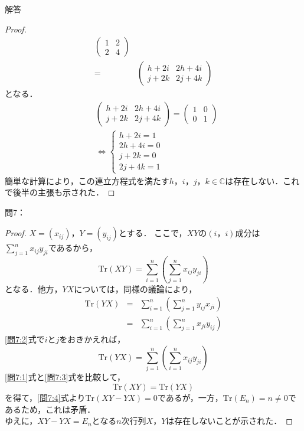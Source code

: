 \documentclass[dvipdfmx,uplatex,11pt]{jsarticle}
\begin{document}
\begin{leftbar}
\begin{itembox}[c]{解答}
\begin{proof}
\begin{align}
\begin{pmatrix}
1 & 2 \\
2 & 4
\end{pmatrix}
\\
 =&
\begin{pmatrix}
h+2 i & 2h + 4i \\
j + 2k & 2j +4k
\end{pmatrix}
\end{align}
となる．
\begin{align}
&
\begin{pmatrix}
h+2 i & 2h + 4i \\
j + 2k & 2j +4k
\end{pmatrix}
=
\begin{pmatrix}
1 & 0 \\
0 & 1 
\end{pmatrix}
\\
&\Leftrightarrow 
\begin{cases}
h+2 i =1 \\
2h + 4i =0 \\
j + 2k =0 \\
2j +4k =1
\end{cases}
\end{align}
簡単な計算により，この連立方程式を満たす$h，i，j，k \in \mathbb{C}$は存在しない．これで後半の主張も示された．
\end{proof}
\end{itembox}
\end{leftbar}
%
\newpage
\setcounter{equation}{0}
問7：
\begin{leftbar}
\begin{proof}
$X=(x_{ij})$，$Y=(y_{ij})$とする．
ここで，$XY$の$(i，i)$成分は$\sum_{j=1}^{n} x_{ij} y_{ji}$であるから，
\begin{equation}
\label{問7:1}
\mathrm{Tr}(XY)  =  \sum_{i=1}^{n} \left( \sum_{j=1}^{n} x_{ij} y_{ji} \right)
\end{equation}
となる．他方，$YX$については，同様の議論により，
\begin{eqnarray}
\mathrm{Tr} (YX) & = & \sum_{i=1}^{n} \left( \sum_{j=1}^{n}  y_{ij} x_{ji} \right) \nonumber \\
\label{問7:2}
 & = & \sum_{i=1}^{n} \left( \sum_{j=1}^{n}  x_{ji} y_{ij}  \right)
\end{eqnarray}
\eqref{問7:2}式で$i$と$j$をおきかえれば，
\begin{equation}
\label{問7:3}
\mathrm{Tr} (YX) = \sum_{j=1}^{n} \left( \sum_{i=1}^{n}  x_{ij} y_{ji}  \right)
\end{equation}
\eqref{問7:1}式と\eqref{問7:3}式を比較して，
\begin{equation}
\label{問7:4}
\mathrm{Tr} (XY) = \mathrm{Tr} (YX)
\end{equation}
を得て，\eqref{問7:4}式より$\mathrm{Tr} (XY-YX) =0$であるが，一方，$\mathrm{Tr} (E_n) =n \neq 0$であるため，これは矛盾．\\
ゆえに，$XY-YX=E_n$となる$n$次行列$X$，$Y$は存在しないことが示された．
\end{proof}
\end{leftbar}
\end{document}
